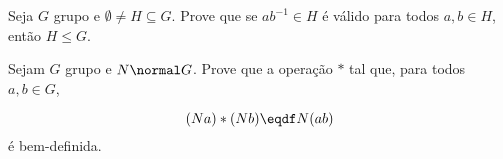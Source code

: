 \begin{exercise}
    Seja $G$ grupo e $\emptyset \ne H \subseteq G$. 
    Prove que se $ab^{-1} \in H$ é válido para todos $a,b \in H$, então $H \leq G$.
\end{exercise}

\begin{exercise}
    Sejam $G$ grupo e $N \normal G$. Prove que a operação $*$ tal que, para todos $a, b \in G$,

    $$
    (Na)*(Nb) \eqdf N(ab)
    $$
    é bem-definida.
\end{exercise}